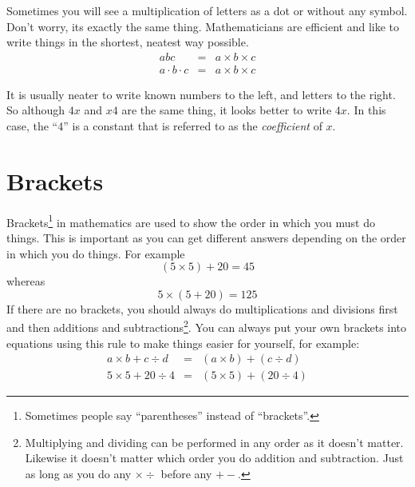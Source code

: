 \documentclass[10pt,a4paper,titlepage,twoside,openright]{report}
\begin{document}
Sometimes you will see a multiplication of letters as a dot or 
without any symbol. Don't worry, its exactly the same thing. Mathematicians are
efficient and like to write things in the shortest, neatest way possible.
\begin{eqnarray}
  \label{eq:mfoundation:alg:m:nox}
  abc&=&a\times b\times c\\
a \cdot b \cdot c&=&a\times b\times c \nonumber
\end{eqnarray}

It is usually neater to write known numbers to the left, and letters to the
right. So although $4x$ and $x4$ are the same thing, it looks better to
write $4x$. In this case, the ``4'' is a constant that is referred to as the
\textit{coefficient} of $x$.


\section{Brackets}
\label{mfoundation:alg:b}
Brackets\footnote{Sometimes people say ``parentheses'' instead of ``brackets''.}
in mathematics are used to show the order in which you must do things. This is
important as you can get different answers depending on the order in which you
do things. For example 
\begin{equation}
  \label{eq:mfoundation:alg:b:parenth1}
  (5\times 5) + 20 = 45
\end{equation}
whereas
\begin{equation}
  \label{eq:mfoundation:alg:b:parenth2}
  5\times (5 + 20) = 125
\end{equation}
If there are no brackets, you should always do multiplications and
divisions first and then additions and subtractions\footnote{Multiplying and
dividing can be performed in any order as it doesn't matter. Likewise it
doesn't matter which order you do addition and subtraction. Just as long as
you do any $\times\div$ before any $+-$.}. You can always put your own brackets
into equations using this rule to make things easier for yourself,  for example:
\begin{eqnarray}
  \label{eq:mfoundation:alg:b:parenth3}
  a\times b + c \div d &=& (a\times b) + (c\div d)\\ \nonumber
  5\times 5 + 20 \div 4 &=& (5\times 5) + (20\div 4)
\end{eqnarray}
\end{document}

